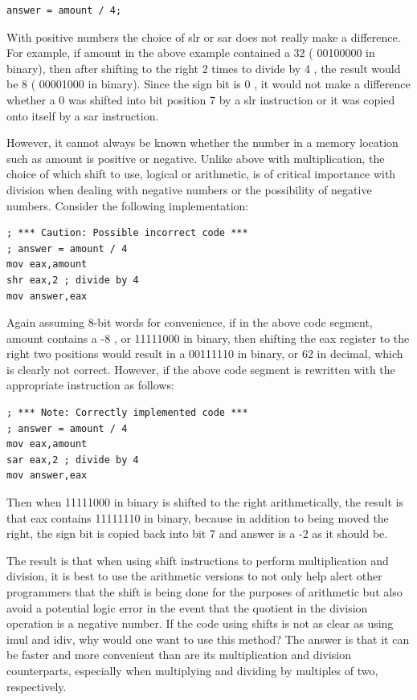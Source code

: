 \documentclass[10pt]{article}
\begin{document}
\begin{verbatim}
answer = amount / 4;
\end{verbatim}

With positive numbers the choice of slr or sar does not really make a difference. For example, if amount in the above example contained a 32 ( 00100000 in binary), then after shifting to the right 2 times to divide by 4 , the result would be 8 ( 00001000 in binary). Since the sign bit is 0 , it would not make a difference whether a 0 was shifted into bit position 7 by a slr instruction or it was copied onto itself by a sar instruction.

However, it cannot always be known whether the number in a memory location such as amount is positive or negative. Unlike above with multiplication, the choice of which shift to use, logical or arithmetic, is of critical importance with division when dealing with negative numbers or the possibility of negative numbers. Consider the following implementation:

\begin{verbatim}
; *** Caution: Possible incorrect code ***
; answer = amount / 4
mov eax,amount
shr eax,2 ; divide by 4
mov answer,eax
\end{verbatim}

Again assuming 8-bit words for convenience, if in the above code segment, amount contains a -8 , or 11111000 in binary, then shifting the eax register to the right two positions would result in a 00111110 in binary, or 62 in decimal, which is clearly not correct. However, if the above code segment is rewritten with the appropriate instruction as follows:

\begin{verbatim}
; *** Note: Correctly implemented code ***
; answer = amount / 4
mov eax,amount
sar eax,2 ; divide by 4
mov answer,eax
\end{verbatim}

Then when 11111000 in binary is shifted to the right arithmetically, the result is that eax contains 11111110 in binary, because in addition to being moved the right, the sign bit is copied back into bit 7 and answer is a -2 as it should be.

The result is that when using shift instructions to perform multiplication and division, it is best to use the arithmetic versions to not only help alert other programmers that the shift is being done for the purposes of arithmetic but also avoid a potential logic error in the event that the quotient in the division operation is a negative number. If the code using shifts is not as clear as using imul and idiv, why would one want to use this method? The answer is that it can be faster and more convenient than are its multiplication and division counterparts, especially when multiplying and dividing by multiples of two, respectively.
\end{document}
